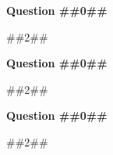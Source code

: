 
\begin{minipage}{\linewidth}

\raggedcolumns
\setlength{\columnseprule}{0.5pt}
\begin{multicols}{3}

\textbf{Question ##{{0}}##} \par
##{{2}}##

\columnbreak

\textbf{Question ##{{0}}##} \par
##{{2}}##

\columnbreak

\textbf{Question ##{{0}}##} \par
##{{2}}##

\end{multicols}
\end{minipage}

